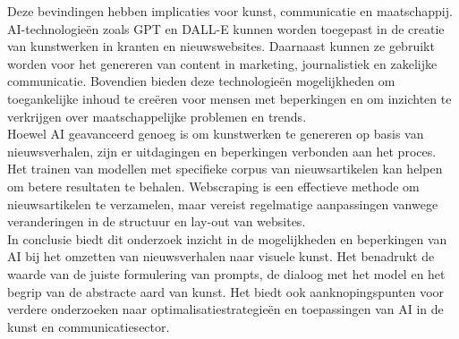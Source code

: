 \documentclass[dutch,dit,thesis]{hogentreport}
\begin{document}
Deze bevindingen hebben implicaties voor kunst, communicatie en maatschappij. AI-technologieën zoals GPT en DALL-E kunnen worden toegepast in de creatie van kunstwerken in kranten en nieuwswebsites. Daarnaast kunnen ze gebruikt worden voor het genereren van content in marketing, journalistiek en zakelijke communicatie. Bovendien bieden deze technologieën mogelijkheden om toegankelijke inhoud te creëren voor mensen met beperkingen en om inzichten te verkrijgen over maatschappelijke problemen en trends.\\

Hoewel AI geavanceerd genoeg is om kunstwerken te genereren op basis van nieuwsverhalen, zijn er uitdagingen en beperkingen verbonden aan het proces. Het trainen van modellen met specifieke corpus van nieuwsartikelen kan helpen om betere resultaten te behalen. Webscraping is een effectieve methode om nieuwsartikelen te verzamelen, maar vereist regelmatige aanpassingen vanwege veranderingen in de structuur en lay-out van websites.\\

In conclusie biedt dit onderzoek inzicht in de mogelijkheden en beperkingen van AI bij het omzetten van nieuwsverhalen naar visuele kunst. Het benadrukt de waarde van de juiste formulering van prompts, de dialoog met het model en het begrip van de abstracte aard van kunst. Het biedt ook aanknopingspunten voor verdere onderzoeken naar optimalisatiestrategieën en toepassingen van AI in de kunst en communicatiesector.



\backmatter{}

\setlength\bibitemsep{2pt} %
\printbibliography[heading=bibintoc]
\end{document}

